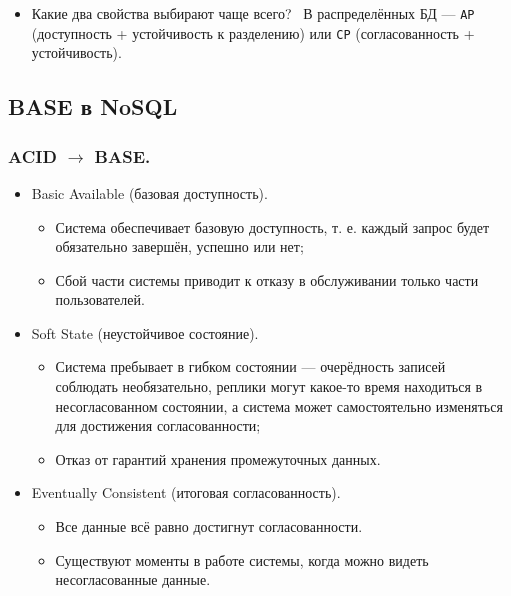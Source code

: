 \documentclass[a4paper,14pt]{article}
\begin{document}
\begin{itemize}
\item Какие два свойства выбирают чаще всего? \
В распределённых БД — \texttt{AP} (доступность + устойчивость к разделению) или \texttt{CP} (согласованность + устойчивость).
\end{itemize}

\subsection{BASE в NoSQL}
\subsubsection*{ACID $\rightarrow$ BASE.}

    \begin{itemize}
        \item Basic Available (базовая доступность).
        \begin{itemize}
            \item Система обеспечивает базовую доступность, т. е.
            каждый запрос будет обязательно завершён, успешно
            или нет;
            \item Сбой части системы приводит к отказу в обслуживании
            только части пользователей.
        \end{itemize}
        \item Soft State (неустойчивое состояние).
        \begin{itemize}
            \item Система пребывает в гибком состоянии — очерёдность
            записей соблюдать необязательно, реплики могут
            какое-то время находиться в несогласованном
            состоянии, а система может самостоятельно изменяться
            для достижения согласованности;
            \item Отказ от гарантий хранения промежуточных данных.
        \end{itemize}
        \item Eventually Consistent (итоговая согласованность).
        \begin{itemize}
            \item Все данные всё равно достигнут согласованности.
            \item Существуют моменты в работе системы, когда можно
            видеть несогласованные данные.
        \end{itemize}
    \end{itemize}
\end{document}
